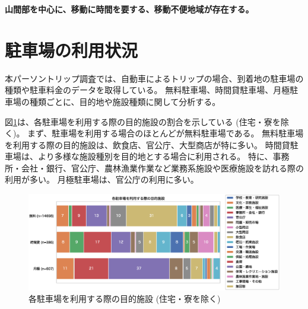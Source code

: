 \documentclass[a4paper,12pt, uplatex]{jsbook}
\begin{document}
\color{red}
\begin{framed}
\noindent
\textbf{\large 山間部を中心に、移動に時間を要する、移動不便地域が存在する。
}
\end{framed}
\color{black}

\clearpage
\section{駐車場の利用状況}
本パーソントリップ調査では、自動車によるトリップの場合、到着地の駐車場の種類や駐車料金のデータを取得している。
無料駐車場、時間貸駐車場、月極駐車場の種類ごとに、目的地や施設種類に関して分析する。

図\ref{fig:facility_share_parking}は、各駐車場を利用する際の目的施設の割合を示している (住宅・寮を除く)。
まず、駐車場を利用する場合のほとんどが無料駐車場である。
無料駐車場を利用する際の目的施設は、飲食店、官公庁、大型商店が特に多い。
時間貸駐車場は、より多様な施設種別を目的地とする場合に利用される。
特に、事務所・会社・銀行、官公庁、農林漁業作業など業務系施設や医療施設を訪れる際の利用が多い。
月極駐車場は、官公庁の利用に多い。
%
\begin{figure}[H]
    \centering
    \includegraphics[width=1.0\textwidth]{picture/facility_share_parking.eps}
    \caption{各駐車場を利用する際の目的施設 (住宅・寮を除く)}
    \label{fig:facility_share_parking}
\end{figure}
\end{document}
